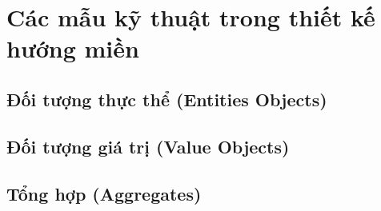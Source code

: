 \documentclass{report} %
\begin{document}
\section{Các mẫu kỹ thuật trong thiết kế hướng miền}
% 
\subsection{Đối tượng thực thể (Entities Objects)}
% 
\subsection{Đối tượng giá trị (Value Objects)}
% 
\subsection{Tổng hợp (Aggregates)}



\end{document}
